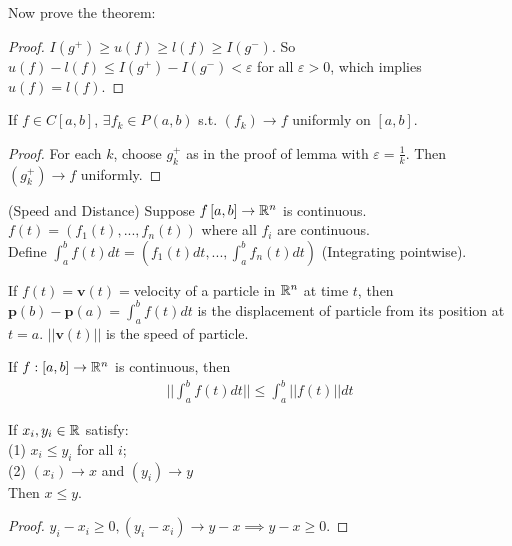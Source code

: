 \documentclass[a4paper]{article}
\begin{document}
Now prove the theorem:
\begin{proof}
$I\left(g^+\right) \geq u\left(f\right) \geq l\left(f\right) \geq I\left(g^-\right)$. So $u\left(f\right) - l\left(f\right) \leq I\left(g^+\right) - I\left(g^-\right) < \varepsilon$ for all $\varepsilon>0$, which implies $u\left(f\right) = l\left(f\right)$.
\end{proof}

\begin{coro}
If $f \in C\left[a,b\right]$, $\exists f_k \in P\left(a,b\right)$ s.t. $\left(f_k\right) \to f$ uniformly on $\left[a,b\right]$.
\begin{proof}
For each $k$, choose $g_k^+$ as in the proof of lemma with $\varepsilon = \frac{1}{k}$. Then $\left(g_k^+\right) \to f$ uniformly.
\end{proof}
\end{coro}

\begin{eg}(Speed and Distance)
Suppose $f\left[a,b\right] \to \mathbb{R}^n$ is continuous. $f\left(t\right) = \left(f_1\left(t\right),...,f_n\left(t\right)\right)$ where all $f_i$ are continuous.\\
Define $\int_a^b f\left(t\right) dt = \left(f_1\left(t\right) dt, ..., \int_a^b f_n\left(t\right) dt\right)$ (Integrating pointwise).

If $f\left(t\right) = \mathbf{v}\left(t\right) = $velocity of a particle in $\mathbb{R}^n$ at time $t$, then $\mathbf{p}\left(b\right) - \mathbf{p}\left(a\right) = \int_a^b f\left(t\right) dt$ is the displacement of particle from its position at $t=a$. $||\mathbf{v}\left(t\right)||$ is the speed of particle.
\end{eg}

\begin{prop}
If $f: \left[a,b\right] \to \mathbb{R}^n$ is continuous, then
\begin{equation*}
\begin{aligned}
||\int_a^b f\left(t\right) dt|| \leq \int_a^b ||f\left(t\right)|| dt
\end{aligned}
\end{equation*}
\end{prop}

\begin{lemma}
If $x_i,y_i \in \mathbb{R}$ satisfy:\\
(1) $x_i \leq y_i$ for all $i$;\\
(2) $\left(x_i\right) \to x$ and $\left(y_i\right) \to y$\\
Then $x \leq y$.
\begin{proof}
$y_i - x_i \geq 0, \left(y_i-x_i\right) \to y-x \implies y-x\geq 0$.
\end{proof}
\end{lemma}
\end{document}
